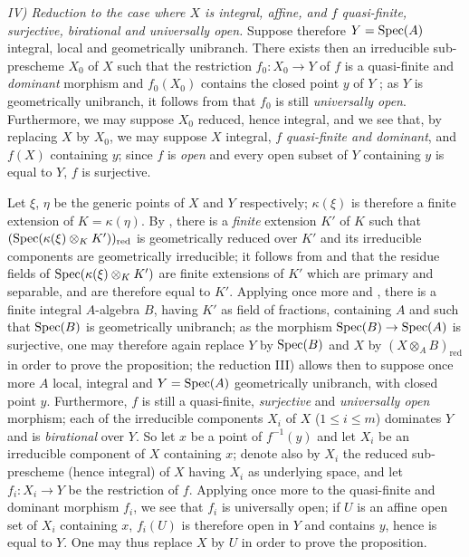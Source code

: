 \emph{IV) Reduction to the case where $X$ is integral, affine, and $f$ quasi-finite, surjective, birational and universally open.}
Suppose therefore $Y=\operatorname{Spec}(A)$ integral, local and geometrically unibranch.
There exists then an irreducible sub-prescheme $X_0$ of $X$ such that the restriction $f_0:X_0\to Y$ of $f$ is a quasi-finite and \emph{dominant} morphism and $f_0(X_0)$ contains the closed point $y$ of $Y$ ; as $Y$ is geometrically unibranch, it follows from  that $f_0$ is still \emph{universally open}.
Furthermore, we may suppose $X_0$ reduced, hence integral, and we see that, by replacing $X$ by $X_0$, we may suppose $X$ integral, $f$ \emph{quasi-finite and dominant}, and $f(X)$ containing $y$; since $f$ is \emph{open} and every open subset of $Y$ containing $y$ is equal to $Y$, $f$ is surjective.

Let $\xi$, $\eta$ be the generic points of $X$ and $Y$ respectively; $\kappa(\xi)$ is therefore a finite extension of $K=\kappa(\eta)$.
By , there is a \emph{finite} extension $K'$ of $K$ such that $(\operatorname{Spec}(\kappa(\xi)\otimes_K K'))_{\mathrm{red}}$ is geometrically reduced over $K'$ and its irreducible components are geometrically irreducible; it follows from  and  that the residue fields of $\operatorname{Spec}(\kappa(\xi)\otimes_K K')$ are finite extensions of $K'$ which are primary and separable, and are therefore equal to $K'$.
Applying once more  and , there is a finite integral $A$-algebra $B$, having $K'$ as field of fractions, containing $A$ and such that $\operatorname{Spec}(B)$ is geometrically unibranch; as the morphism $\operatorname{Spec}(B)\to\operatorname{Spec}(A)$ is surjective, one may therefore again replace $Y$ by $\operatorname{Spec}(B)$ and $X$ by $(X\otimes_A B)_{\mathrm{red}}$ in order to prove the proposition; the reduction III) allows then to suppose once more $A$ local, integral and $Y=\operatorname{Spec}(A)$ geometrically unibranch, with closed point $y$.
Furthermore, $f$ is still a quasi-finite, \emph{surjective} and \emph{universally open} morphism; each of the irreducible components $X_i$ of $X$ ($1\leq i\leq m$) dominates $Y$  and is \emph{birational} over $Y$.
So let $x$ be a point of $f^{-1}(y)$ and let $X_i$ be an irreducible component of $X$ containing $x$; denote also by $X_i$ the reduced sub-prescheme (hence integral) of $X$ having $X_i$ as underlying space, and let $f_i:X_i\to Y$ be the restriction of $f$.
Applying once more  to the quasi-finite and dominant morphism $f_i$, we see that $f_i$ is universally open; if $U$ is an affine open set of $X_i$ containing $x$, $f_i(U)$ is therefore
open in $Y$ and contains $y$, hence is equal to $Y$.
One may thus replace $X$ by $U$ in order to prove the proposition.

